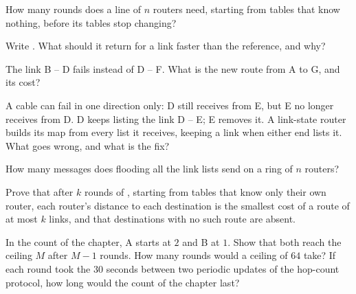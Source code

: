 \begin{exercise}[$\star\star$]\label{exo:g12:routing:7}
How many rounds does a line of $n$ routers need, starting from tables that know nothing, before its tables stop
changing?
\end{exercise}

\begin{exercise}[$\star\star$]\label{exo:g12:routing:8}
Write . What should it return for a link faster than the reference, and why?
\end{exercise}

\begin{exercise}[$\star\star$]\label{exo:g12:routing:9}
The link B -- D fails instead of D -- F. What is the new route from A to G, and its cost?
\end{exercise}

\begin{exercise}[$\star\star$]\label{exo:g12:routing:10}
A cable can fail in one direction only: D still receives from E, but E no longer receives from D. D keeps listing the
link D -- E; E removes it. A link-state router builds its map from every list it receives, keeping a link when either
end lists it. What goes wrong, and what is the fix?
\end{exercise}

\begin{exercise}[$\star\star$]\label{exo:g12:routing:11}
How many messages does flooding all the link lists send on a ring of $n$ routers?
\end{exercise}

\begin{exercise}[$\star\star\star$]\label{exo:g12:routing:12}
Prove that after $k$ rounds of , starting from tables that know only their own router, each router's
distance to each destination is the smallest cost of a route of at most $k$ links, and that destinations with no
such route are absent.
\end{exercise}

\begin{exercise}[$\star\star\star$]\label{exo:g12:routing:13}
In the count of the chapter, A starts at $2$ and B at $1$. Show that both reach the ceiling $M$ after $M - 1$ rounds.
How many rounds would a ceiling of $64$ take? If each round took the $30$ seconds between two periodic updates of the
hop-count protocol, how long would the count of the chapter last?
\end{exercise}

